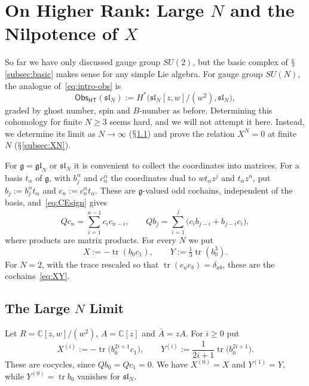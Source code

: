 \documentclass[11pt]{amsart}
\numberwithin{equation}{section}
\renewcommand{\S}{\mbox{$\mathsection$}}
\theoremstyle{definition}
\theoremstyle{remark}
\newcommand{\C}{\mathbb{C}}
\newcommand{\g}{\mathfrak{g}}
\newcommand{\Obs}{\mathsf{Obs}_{\mathsf{HT}}}
\begin{document}
\section{On Higher Rank: Large \texorpdfstring{$N$}{N} and the Nilpotence of \texorpdfstring{$X$}{X}}\label{sec:higher}

So far we have only discussed gauge group $SU(2)$, but the basic complex of \S\ref{subsec:basic} makes sense for any simple Lie algebra. For gauge group $SU(N)$, the analogue of~\eqref{eq:intro-obs} is
\begin{equation}\label{eq:obs-slN}
\Obs(\mathfrak{sl}_N):=H^*\bigl(\mathfrak{sl}_N[z,w]/(w^2),\mathfrak{sl}_N\bigr),
\end{equation}
graded by ghost number, spin and $B$-number as before. Determining this cohomology for finite $N\ge3$ seems hard, and we will not attempt it here. Instead, we determine its limit as $N\to\infty$ (\S\ref{subsec:largeN}) and prove the relation $X^N=0$ at finite $N$ (\S\ref{subsec:XN}).

For $\g=\mathfrak{gl}_N$ or $\mathfrak{sl}_N$ it is convenient to collect the coordinates into matrices. For a basis $t_\alpha$ of $\g$, with $b_j^\alpha$ and $c_n^\alpha$ the coordinates dual to $wt_\alpha z^j$ and $t_\alpha z^n$, put $b_j:=b_j^\alpha t_\alpha$ and $c_n:=c_n^\alpha t_\alpha$. These are $\g$-valued odd cochains, independent of the basis, and~\eqref{eq:CEsign} gives
\begin{equation}\label{eq:Q-matrix}
Qc_n=\sum_{i=1}^{n-1}c_ic_{n-i},\qquad Qb_j=\sum_{i=1}^{j}\bigl(c_ib_{j-i}+b_{j-i}c_i\bigr),
\end{equation}
where products are matrix products. For every $N$ we put
\begin{equation}\label{eq:XY-slN}
X:=-\operatorname{tr}(b_0c_1),\qquad Y:=\tfrac13\operatorname{tr}(b_0^3).
\end{equation}
For $N=2$, with the trace rescaled so that $\operatorname{tr}(e_ae_b)=\delta_{ab}$, these are the cochains~\eqref{eq:XY}.

\subsection{The Large \texorpdfstring{$N$}{N} Limit}\label{subsec:largeN}
Let $R=\C[z,w]/(w^2)$, $A=\C[z]$ and $\bar A=zA$. For $i\ge0$ put
\begin{equation}\label{eq:XY-i}
X^{(i)}:=-\operatorname{tr}\bigl(b_0^{2i+1}c_1\bigr),\qquad Y^{(i)}:=\frac1{2i+1}\operatorname{tr}\bigl(b_0^{2i+1}\bigr).
\end{equation}
These are cocycles, since $Qb_0=Qc_1=0$. We have $X^{(0)}=X$ and $Y^{(1)}=Y$, while $Y^{(0)}=\operatorname{tr}b_0$ vanishes for $\mathfrak{sl}_N$.
\end{document}
